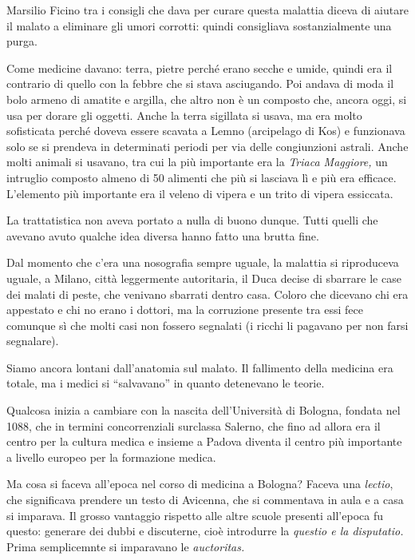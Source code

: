 \documentclass[]{article}
\begin{document}
Marsilio Ficino tra i consigli che dava per curare questa malattia
diceva di aiutare il malato a eliminare gli umori corrotti: quindi
consigliava sostanzialmente una purga.

Come medicine davano: terra, pietre perché erano secche e umide, quindi
era il contrario di quello con la febbre che si stava asciugando. Poi
andava di moda il bolo armeno di amatite e argilla, che altro non è un
composto che, ancora oggi, si usa per dorare gli oggetti. Anche la terra
sigillata si usava, ma era molto sofisticata perché doveva essere
scavata a Lemno (arcipelago di Kos) e funzionava solo se si prendeva in
determinati periodi per via delle congiunzioni astrali. Anche molti
animali si usavano, tra cui la più importante era la \emph{Triaca
Maggiore,} un intruglio composto almeno di 50 alimenti che più si
lasciava lì e più era efficace. L'elemento più importante era il veleno
di vipera e un trito di vipera essiccata.

La trattatistica non aveva portato a nulla di buono dunque. Tutti quelli
che avevano avuto qualche idea diversa hanno fatto una brutta fine.

Dal momento che c'era una nosografia sempre uguale, la malattia si
riproduceva uguale, a Milano, città leggermente autoritaria, il Duca
decise di sbarrare le case dei malati di peste, che venivano sbarrati
dentro casa. Coloro che dicevano chi era appestato e chi no erano i
dottori, ma la corruzione presente tra essi fece comunque sì che molti
casi non fossero segnalati (i ricchi li pagavano per non farsi
segnalare).

Siamo ancora lontani dall'anatomia sul malato. Il fallimento della
medicina era totale, ma i medici si ``salvavano'' in quanto detenevano
le teorie.

Qualcosa inizia a cambiare con la nascita dell'Università di Bologna,
fondata nel 1088, che in termini concorrenziali surclassa Salerno, che
fino ad allora era il centro per la cultura medica e insieme a Padova
diventa il centro più importante a livello europeo per la formazione
medica.

Ma cosa si faceva all'epoca nel corso di medicina a Bologna? Faceva una
\emph{lectio}, che significava prendere un testo di Avicenna, che si
commentava in aula e a casa si imparava. Il grosso vantaggio rispetto
alle altre scuole presenti all'epoca fu questo: generare dei dubbi e
discuterne, cioè introdurre la \emph{questio e la disputatio.} Prima
semplicemnte si imparavano le \emph{auctoritas. }
\end{document}
